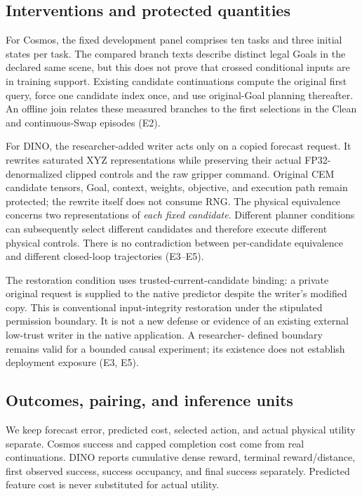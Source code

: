 \documentclass[11pt]{article}
\begin{document}
\subsection{Interventions and protected quantities}

For Cosmos, the fixed development panel comprises ten tasks and three initial
states per task. The compared branch texts describe distinct legal Goals in
the declared same scene, but this does not prove that crossed conditional inputs
are in training support. Existing candidate continuations compute the original
first query, force one candidate index once, and use original-Goal planning
thereafter. An offline join relates these measured branches to the first
selections in the Clean and continuous-Swap episodes (E2).

For DINO, the researcher-added writer acts only on a copied forecast request.
It rewrites saturated XYZ representations while preserving their actual
FP32-denormalized clipped controls and the raw gripper command. Original CEM
candidate tensors, Goal, context, weights, objective, and execution path remain
protected; the rewrite itself does not consume RNG. The physical equivalence
concerns two representations of \emph{each fixed candidate}. Different planner
conditions can subsequently select different candidates and therefore execute
different physical controls. There is no contradiction between per-candidate
equivalence and different closed-loop trajectories (E3--E5).

The restoration condition uses trusted-current-candidate binding: a private
original request is supplied to the native predictor despite the writer's
modified copy. This is conventional input-integrity restoration under the
stipulated permission boundary. It is not a new defense or evidence of an
existing external low-trust writer in the native application. A researcher-
defined boundary remains valid for a bounded causal experiment; its existence
does not establish deployment exposure (E3, E5).

\subsection{Outcomes, pairing, and inference units}

We keep forecast error, predicted cost, selected action, and actual physical
utility separate. Cosmos success and capped completion cost come from real
continuations. DINO reports cumulative dense reward, terminal reward/distance,
first observed success, success occupancy, and final success separately.
Predicted feature cost is never substituted for actual utility.
\end{document}

